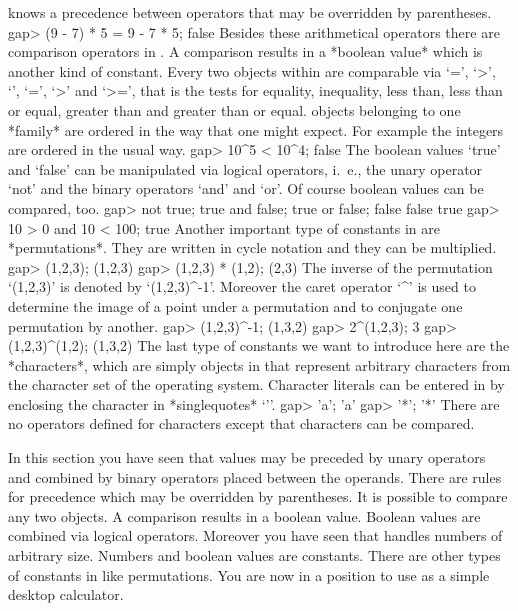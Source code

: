 {\GAP}  knows a  precedence  between operators that may be overridden  by
parentheses.
\beginexample
    gap> (9 - 7) * 5 = 9 - 7  * 5;
    false 
\endexample
Besides  these arithmetical operators  there  are comparison operators in
{\GAP}. A comparison results  in a *boolean value*  which is another kind
of constant.  Every  two objects  within  {\GAP} are comparable  via `=',
`\<>', `\<', `\<=',  `>'  and  `>=', that   is the tests   for  equality,
inequality, less than, less than or equal, greater  than and greater than
or equal. {\GAP} objects belonging to one *family*
%
are ordered in  the way that one might  expect. For example the  integers
are ordered in the usual way.
\beginexample
    gap> 10^5 < 10^4;
    false 
\endexample
The boolean values  `true' and   `false'  can be  manipulated via logical
operators, i.~e., the unary operator `not' and the binary operators `and'
and `or'.  Of course boolean values can be compared, too.
\beginexample
    gap> not true; true and false; true or false;
    false
    false
    true
    gap> 10 > 0 and 10 < 100;
    true 
\endexample
Another important  type of constants in   {\GAP} are *permutations*. They
are written in cycle notation and they can be multiplied.
\beginexample
    gap> (1,2,3);
    (1,2,3)
    gap> (1,2,3) * (1,2);
    (2,3) 
\endexample
The inverse of the   permutation  `(1,2,3)' is denoted   by `(1,2,3)^-1'.
Moreover the caret operator `^' is used to determine the image of a point
under a permutation and to conjugate one permutation by another.
\beginexample
    gap> (1,2,3)^-1;
    (1,3,2)
    gap> 2^(1,2,3);
    3
    gap> (1,2,3)^(1,2);
    (1,3,2) 
\endexample
The    last  type  of   constants  we  want  to introduce    here are the
*characters*, which are simply objects in {\GAP} that represent arbitrary
characters  from  the character set   of the  operating system. Character
literals can  be  entered   in  {\GAP} by  enclosing  the   character  in
*singlequotes* `{'}'.
\beginexample
    gap> 'a';
    'a'
    gap> '*';
    '*' 
\endexample
There are no  operators defined for characters except that characters can
be compared.

In  this section  you have  seen  that  values  may be preceded  by unary
operators  and combined  by binary operators placed between the operands.
There  are  rules for precedence which may  be overridden by parentheses.
It  is possible to  compare any  two objects.  A comparison  results in a
boolean value.   Boolean  values  are  combined  via  logical  operators.
Moreover  you have seen that  {\GAP}  handles numbers of arbitrary  size.
Numbers  and boolean values  are  constants.  There  are  other  types of
constants in {\GAP} like permutations.  You  are now in a position to use
{\GAP} as a simple desktop calculator.

